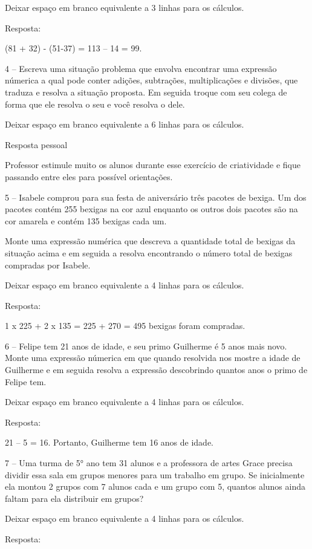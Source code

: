 Deixar espaço em branco equivalente a 3 linhas para os cálculos.

Resposta:

(81 + 32) - (51-37) = 113 -- 14 = 99.

4 -- Escreva uma situação problema que envolva encontrar uma expressão
númerica a qual pode conter adições, subtrações, multiplicações e
divisões, que traduza e resolva a situação proposta. Em seguida troque
com seu colega de forma que ele resolva o seu e você resolva o dele.

Deixar espaço em branco equivalente a 6 linhas para os cálculos.

Resposta pessoal

Professor estimule muito os alunos durante esse exercício de
criatividade e fique passando entre eles para possível orientações.

5 -- Isabele comprou para sua festa de aniversário três pacotes de
bexiga. Um dos pacotes contém 255 bexigas na cor azul enquanto os outros
dois pacotes são na cor amarela e contém 135 bexigas cada um.

Monte uma expressão numérica que descreva a quantidade total de bexigas
da situação acima e em seguida a resolva encontrando o número total de
bexigas compradas por Isabele.

Deixar espaço em branco equivalente a 4 linhas para os cálculos.

Resposta:

1 x 225 + 2 x 135 = 225 + 270 = 495 bexigas foram compradas.

6 -- Felipe tem 21 anos de idade, e seu primo Guilherme é 5 anos mais
novo. Monte uma expressão númerica em que quando resolvida nos mostre a
idade de Guilherme e em seguida resolva a expressão descobrindo quantos
anos o primo de Felipe tem.

Deixar espaço em branco equivalente a 4 linhas para os cálculos.

Resposta:

21 -- 5 = 16. Portanto, Guilherme tem 16 anos de idade.

7 -- Uma turma de 5° ano tem 31 alunos e a professora de artes Grace
precisa dividir essa sala em grupos menores para um trabalho em grupo.
Se inicialmente ela montou 2 grupos com 7 alunos cada e um grupo com 5,
quantos alunos ainda faltam para ela distribuir em grupos?

Deixar espaço em branco equivalente a 4 linhas para os cálculos.

Resposta:

